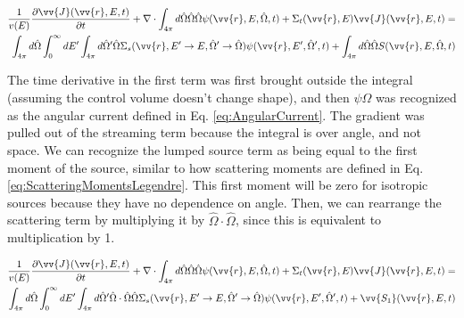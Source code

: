 \documentclass[10pt]{article}
\newcommand{\hO}{\hat{\Omega}}
\newcommand{\spa}{(\vv{r}, E, \hO, t)}
\begin{document}
\begin{flushleft}
\begin{equation}
\label{eq:TEAngleAngleIntegrated}
\begin{aligned}
\frac{1}{v(E)} \frac{\partial\vv{J}(\vv{r}, E, t)}{\partial t} +
 \nabla\cdot \int_{4\pi}^{} d\hO  \hO  \hO  \psi(\vv{r}, E, \hO  ,t) + 
 \Sigma_t(\vv{r},E)\vv{J}(\vv{r}, E, t) = \\
 \int_{4\pi}^{} d\hO   \int_{0}^{\infty}dE' \int_{4\pi}^{ } d\hO  ' \hO  \Sigma_s(\vv{r}, E'\rightarrow E, \hO  '\rightarrow\hO  )\psi(\vv{r}, E', \hO  ',t) + \int_{4\pi}^{} d\hO  \hO  S\spa \\
\end{aligned}
\end{equation}

The time derivative in the first term was first brought outside the integral (assuming the control volume doesn't change shape), and then \(\psi\hO  \) was recognized as the angular current defined in Eq. \ref{eq:AngularCurrent}. The gradient was pulled out of the streaming term because the integral is over angle, and not space. We can recognize the lumped source term as being equal to the first moment of the source, similar to how scattering moments are defined in Eq. \ref{eq:ScatteringMomentsLegendre}. This first moment will be zero for isotropic sources because they have no dependence on angle. Then, we can rearrange the scattering term by multiplying it by \(\hO  \cdot\hO  \), since this is equivalent to multiplication by 1.

\begin{equation}
\label{eq:TEAngleAngleIntegrated}
\begin{aligned}
\frac{1}{v(E)} \frac{\partial\vv{J}(\vv{r}, E, t)}{\partial t} +
 \nabla\cdot \int_{4\pi}^{} d\hO   \hO  \hO  \psi(\vv{r}, E, \hO  ,t) + 
 \Sigma_t(\vv{r},E)\vv{J}(\vv{r}, E, t) = \\
 \int_{4\pi}^{} d\hO   \int_{0}^{\infty}dE' \int_{4\pi}^{ } d\hO  ' \hO  \cdot\hO   \hO  \Sigma_s(\vv{r}, E'\rightarrow E, \hO  '\rightarrow\hO  )\psi(\vv{r}, E', \hO  ',t) + \vv{S_1}(\vv{r}, E, t)\\
\end{aligned}
\end{equation}




\end{flushleft}
\end{document}
